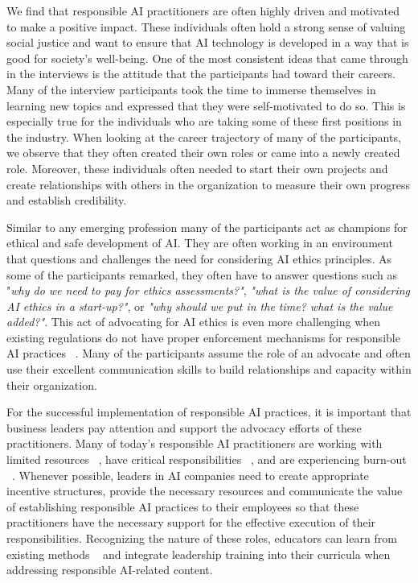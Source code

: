 \documentclass[sigconf]{acmart}
\begin{document}
We find that responsible AI practitioners are often highly driven and motivated to make a positive impact. These individuals often hold a strong sense of valuing social justice and want to ensure that \ac{AI} technology is developed in a way that is good for society's well-being. One of the most consistent ideas that came through in the interviews is the attitude that the participants had toward their careers. Many of the interview participants took the time to immerse themselves in learning new topics and expressed that they were self-motivated to do so. This is especially true for the individuals who are taking some of these first positions in the industry. When looking at the career trajectory of many of the participants, we observe that they often created their own roles or came into a newly created role. Moreover, these individuals often needed to start their own projects and create relationships with others in the organization to measure their own progress and establish credibility. 

Similar to any emerging profession many of the participants act as champions for ethical and safe development of \ac{AI}. They are often working in an environment that questions and challenges the need for considering \ac{AI} ethics principles. As some of the participants remarked, they often have to answer questions such as "\textit{why do we need to pay for ethics assessments?"},\textit{ "what is the value of considering \ac{AI} ethics in a start-up?"}, or \textit{"why should we put in the time? what is the value added?"}. This act of advocating for \ac{AI} ethics is even more challenging when existing regulations do not have proper enforcement mechanisms for responsible AI practices ~\cite{Costanza-Chock2022-ch}. Many of the participants assume the role of an advocate and often use their excellent communication skills to build relationships and capacity within their organization. 

For the successful implementation of responsible AI practices, it is important that business leaders pay attention and support the advocacy efforts of these practitioners. Many of today's responsible AI practitioners are working with limited resources ~\cite{Moss2020}, have critical responsibilities ~\cite{Rakova2021c}, and are experiencing burn-out ~\cite{Heikkila2022-ld}. Whenever possible, leaders in AI companies need to create appropriate incentive structures, provide the necessary resources and communicate the value of establishing responsible AI practices to their employees so that these practitioners have the necessary support for the effective execution of their responsibilities. Recognizing the nature of these roles, educators can learn from existing methods ~\cite{Farr2009-ab,Carter2011-np} and integrate leadership training into their curricula when addressing responsible AI-related content. 
%
\end{document}
